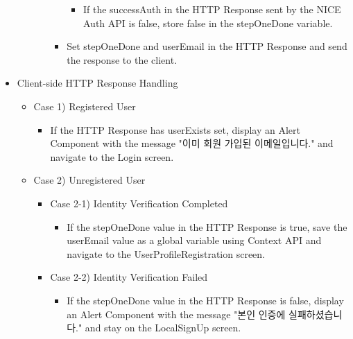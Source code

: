 \documentclass[conference]{IEEEtran}
\begin{document}
\begin{itemize}
\begin{itemize}
\begin{itemize}
\begin{itemize}
                \begin{itemize}
                    \item If the successAuth in the HTTP Response sent by the NICE Auth API is false, store false in the stepOneDone variable.
                \end{itemize}
                \item Set stepOneDone and userEmail in the HTTP Response and send the response to the client.
                \\
            \end{itemize}
        \end{itemize}
    \end{itemize}
    \item Client-side HTTP Response Handling
    \begin{itemize}
        \item Case 1) Registered User
        \begin{itemize}
            \item If the HTTP Response has userExists set, display an Alert Component with the message "이미 회원 가입된 이메일입니다." and navigate to the Login screen.
        \end{itemize}
        \item Case 2) Unregistered User
        \begin{itemize}
            \item Case 2-1) Identity Verification Completed
            \begin{itemize}
                \item If the stepOneDone value in the HTTP Response is true, save the userEmail value as a global variable using Context API and navigate to the UserProfileRegistration screen.
            \end{itemize}
            \item Case 2-2) Identity Verification Failed
            \begin{itemize}
                \item If the stepOneDone value in the HTTP Response is false, display an Alert Component with the message "본인 인증에 실패하셨습니다." and stay on the LocalSignUp screen.
                \\
            \end{itemize}
        \end{itemize}
    \end{itemize}
\end{itemize}
\end{document}
